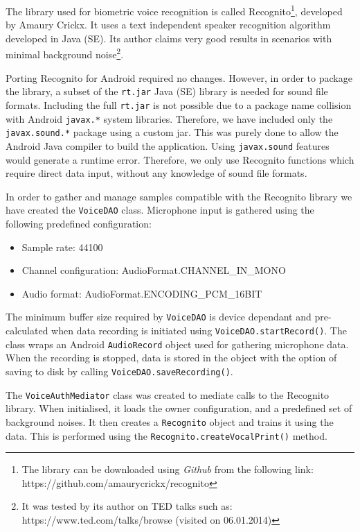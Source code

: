 The library used for biometric voice recognition is called Recognito\footnote{The library can be downloaded using {\em Github} from the following link: https://github.com/amaurycrickx/recognito}, developed by Amaury Crickx. It uses a text independent speaker recognition algorithm developed in Java (SE). Its author claims very good results in scenarios with minimal background noise\footnote{It was tested by its author on TED talks such as:  https://www.ted.com/talks/browse (visited on 06.01.2014)}.

Porting Recognito for Android required no changes. However, in order to package the library, a subset of the {\tt rt.jar} Java (SE) library is needed for sound file formats. Including the full {\tt rt.jar} is not possible due to a package name collision with Android {\tt javax.*} system libraries. Therefore, we have included only the {\tt javax.sound.*} package using a custom jar. This was purely done to allow the Android Java compiler to build the application. Using {\tt javax.sound} features would generate a runtime error. Therefore, we only use Recognito functions which require direct data input, without any knowledge of sound file formats.

In order to gather and manage samples compatible with the Recognito library we have created the {\tt VoiceDAO} class. Microphone input is gathered using the following predefined configuration:
\begin{itemize}
	\item Sample rate: 44100
	\item Channel configuration: AudioFormat.CHANNEL\_IN\_MONO
	\item Audio format: AudioFormat.ENCODING\_PCM\_16BIT
\end{itemize}

The minimum buffer size required by {\tt VoiceDAO} is device dependant and pre-calculated when data recording is initiated using {\tt VoiceDAO.startRecord()}. The class wraps an Android {\tt AudioRecord} object used for gathering microphone data. When the recording is stopped, data is stored in the object with the option of saving to disk by calling {\tt VoiceDAO.saveRecording()}. 

The {\tt VoiceAuthMediator} class was created to mediate calls to the Recognito library. When initialised, it loads the owner configuration, and a predefined set of background noises. It then creates a {\tt Recognito} object and trains it using the data. This is performed using the {\tt Recognito.createVocalPrint()} method.

